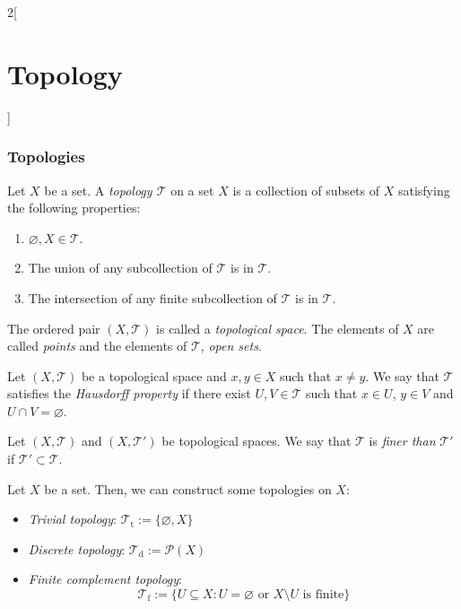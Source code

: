 \documentclass[../../../main.tex]{subfiles}
\begin{document}
\begin{multicols}{2}[\section{Topology}]
  \subsubsection*{Topologies}
  \begin{definition}
    Let $X$ be a set. A \textit{topology $\mathcal{T}$} on a set $X$ is a collection of subsets of $X$ satisfying the following properties:
    \begin{enumerate}
      \item $\varnothing, X\in\mathcal{T}$.
      \item The union of any subcollection of $\mathcal{T}$ is in $\mathcal{T}$.
      \item The intersection of any finite subcollection of $\mathcal{T}$ is in $\mathcal{T}$.
    \end{enumerate}
    The ordered pair $(X,\mathcal{T})$ is called a \textit{topological space}. The elements of $X$ are called \textit{points} and the elements of $\mathcal{T}$, \textit{open sets}.
  \end{definition}
  \begin{definition}
    Let $(X,\mathcal{T})$ be a topological space and $x,y\in X$ such that $x\ne y$. We say that $\mathcal{T}$ satisfies the \textit{Hausdorff property} if there exist $U,V\in\mathcal{T}$ such that $x\in U$, $y\in V$ and $U\cap V=\varnothing$.
  \end{definition}
  \begin{definition}
    Let $(X,\mathcal{T})$ and $(X,\mathcal{T}')$ be topological spaces. We say that $\mathcal{T}$ is \textit{finer than} $\mathcal{T}'$ if $\mathcal{T}'\subset\mathcal{T}$.
  \end{definition}
  \begin{prop}
    Let $X$ be a set. Then, we can construct some topologies on $X$:
    \begin{itemize}
      \item \textit{Trivial topology}: $\mathcal{T}_\text{t}:=\{\varnothing,X\}$
      \item \textit{Discrete topology}: $\mathcal{T}_\text{d}:=\mathcal{P}(X)$
      \item \textit{Finite complement topology}: $$\mathcal{T}_\text{f}:=\{U\subseteq X:U=\varnothing\text{ or }X\setminus U\text{ is finite}\}$$
    \end{itemize}
  \end{prop}
\end{multicols}
\end{document}
